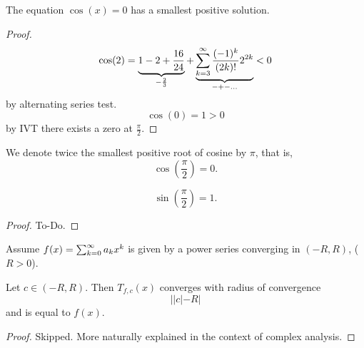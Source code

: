 \begin{theorem}\label{thm:cos_smallest_pos}
    The equation $\cos(x) = 0$ has a smallest positive solution.
\end{theorem}
\begin{proof}
    \[
    \cos(2) = \underbrace{1 - 2 + \frac{16}{24}}_{-\frac{2}{3}} + \underbrace{\infsum[k = 3]\frac{(-1) ^ k}{(2k)!}2 ^ {2k}}_{-+-\dotsc} < 0
    \]
    by alternating series test.
    \[
    \cos(0) = 1 > 0
    \]
    by IVT there exists a zero at $\frac{\pi}{2}$.
\end{proof}

\begin{definition}\label{def:pi_def}
    We denote twice the smallest positive root of cosine by $\pi$,
    that is,
    \[
    \cos\left(\frac{\pi}{2}\right) = 0.
    \]
\end{definition}

\begin{theorem}\label{thm:sin_eq_one}
    \[
    \sin\left(\frac{\pi}{2}\right) = 1.
    \]
\end{theorem}
\begin{proof}
    To-Do.
\end{proof}

\begin{proposition}\label{prop:pow_series_radconv_taylor}
    Assume $f(x) = \infsumo a_kx ^ k$ is given by a power series converging in $(-R, R)$,
    ($R > 0$).

    Let $c \in (-R, R)$.
    Then $T_{f, c}(x)$ converges with radius of convergence
    \[
    ||c| - R|
    \]
    and is equal to $f(x)$.
\end{proposition}
\begin{proof}
    Skipped.
    More naturally explained in the context of complex analysis.
\end{proof}